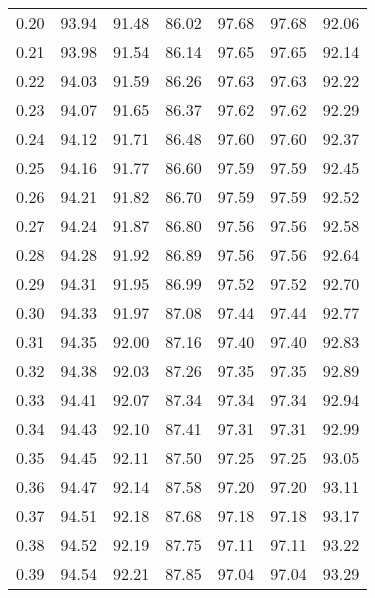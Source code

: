 \begin{tabular}{|c|c|c|c|c|c|c|}
      0.20 &     93.94 &     91.48 &      86.02 &   97.68 &      97.68 &         92.06 \\
      0.21 &     93.98 &     91.54 &      86.14 &   97.65 &      97.65 &         92.14 \\
      0.22 &     94.03 &     91.59 &      86.26 &   97.63 &      97.63 &         92.22 \\
      0.23 &     94.07 &     91.65 &      86.37 &   97.62 &      97.62 &         92.29 \\
      0.24 &     94.12 &     91.71 &      86.48 &   97.60 &      97.60 &         92.37 \\
      0.25 &     94.16 &     91.77 &      86.60 &   97.59 &      97.59 &         92.45 \\
      0.26 &     94.21 &     91.82 &      86.70 &   97.59 &      97.59 &         92.52 \\
      0.27 &     94.24 &     91.87 &      86.80 &   97.56 &      97.56 &         92.58 \\
      0.28 &     94.28 &     91.92 &      86.89 &   97.56 &      97.56 &         92.64 \\
      0.29 &     94.31 &     91.95 &      86.99 &   97.52 &      97.52 &         92.70 \\
      0.30 &     94.33 &     91.97 &      87.08 &   97.44 &      97.44 &         92.77 \\
      0.31 &     94.35 &     92.00 &      87.16 &   97.40 &      97.40 &         92.83 \\
      0.32 &     94.38 &     92.03 &      87.26 &   97.35 &      97.35 &         92.89 \\
      0.33 &     94.41 &     92.07 &      87.34 &   97.34 &      97.34 &         92.94 \\
      0.34 &     94.43 &     92.10 &      87.41 &   97.31 &      97.31 &         92.99 \\
      0.35 &     94.45 &     92.11 &      87.50 &   97.25 &      97.25 &         93.05 \\
      0.36 &     94.47 &     92.14 &      87.58 &   97.20 &      97.20 &         93.11 \\
      0.37 &     94.51 &     92.18 &      87.68 &   97.18 &      97.18 &         93.17 \\
      0.38 &     94.52 &     92.19 &      87.75 &   97.11 &      97.11 &         93.22 \\
      0.39 &     94.54 &     92.21 &      87.85 &   97.04 &      97.04 &         93.29 \\

\end{tabular}
